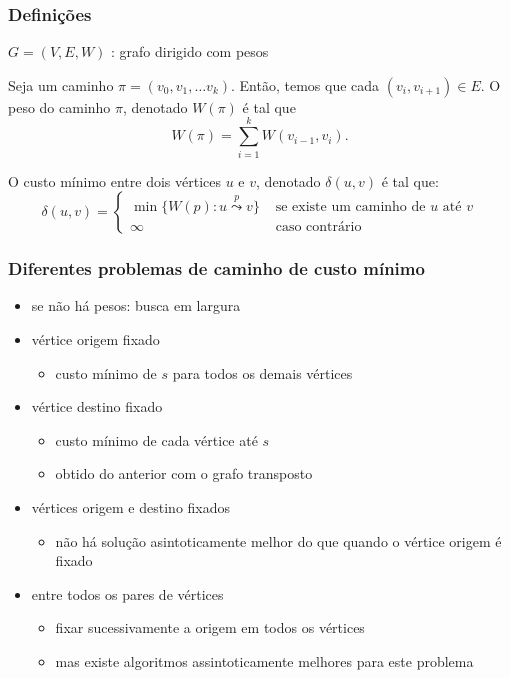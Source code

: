 \documentclass{beamer}
\begin{document}
\begin{frame}
\frametitle{Definições}

\begin{center}
$G = (V, E, W)$ : grafo dirigido com pesos 
\end{center}

\begin{definition}
Seja um caminho $\pi = (v_0, v_1, \ldots v_k)$. Então, temos que cada $(v_i,
v_{i+1}) \in E$. O \alert{peso do caminho} $\pi$, denotado $W(\pi)$ é tal que
$$W(\pi) = \sum_{i=1}^{k} W(v_{i-1}, v_i).$$
\end{definition}

\begin{definition}
O \alert{custo mínimo} entre dois vértices $u$ e $v$, denotado $\delta(u, v)$ é
tal que:
$$
\delta(u, v) =
\left\{
\begin{array}{ll}
\min \{ W(p) : u \overset{p}{\leadsto} v\} & \text{ se existe um caminho de $u$ até $v$}\\
\infty & \text{ caso contrário}
\end{array}
\right.
$$
\end{definition}

\end{frame}

\begin{frame}

\frametitle{Diferentes problemas de caminho de custo mínimo}

\begin{itemize}
\item se não há pesos: busca em largura
\item vértice origem fixado
\begin{itemize}
\item custo mínimo de $s$ para todos os demais vértices
\end{itemize}
\item vértice destino fixado
\begin{itemize}
\item custo mínimo de cada vértice até $s$
\item obtido do anterior com o grafo transposto
\end{itemize}
\item vértices origem e destino fixados
\begin{itemize}
\item não há solução asintoticamente melhor do que quando o vértice origem é fixado
\end{itemize}
\item entre todos os pares de vértices
\begin{itemize}
\item fixar sucessivamente a origem em todos os vértices
\item mas existe algoritmos assintoticamente melhores para este problema
\end{itemize}
\end{itemize}
\end{frame}
\end{document}
